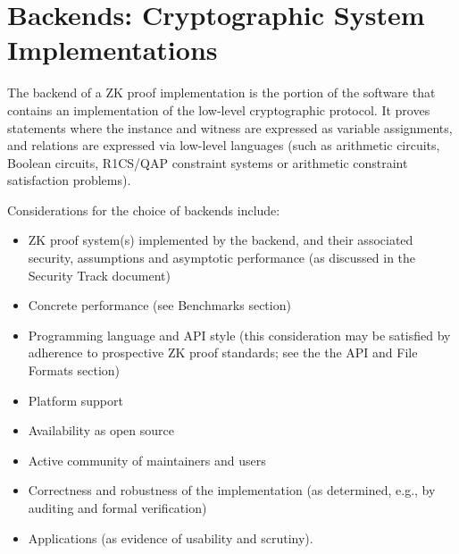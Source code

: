 \section{Backends: Cryptographic System Implementations}
\label{implem:backends}

The backend of a ZK proof implementation is the portion of the software that contains an implementation of the low-level cryptographic protocol. It proves statements where the instance and witness are expressed as variable assignments, and relations are expressed via low-level languages (such as arithmetic circuits, Boolean circuits, R1CS/QAP constraint systems or arithmetic constraint satisfaction problems).



Considerations for the choice of backends include:

\begin{itemize}
\item ZK proof system(s) implemented by the backend, and their associated security, assumptions and asymptotic performance (as discussed in the Security Track document)
\item Concrete performance (see Benchmarks section)
\item Programming language and API style (this consideration may be satisfied by adherence to prospective ZK proof standards; see the the API and File Formats section)
\item Platform support
\item Availability as open source
\item Active community of maintainers and users
\item Correctness and robustness of the implementation (as determined, e.g., by auditing and formal verification)
\item Applications (as evidence of usability and scrutiny).
\end{itemize}
